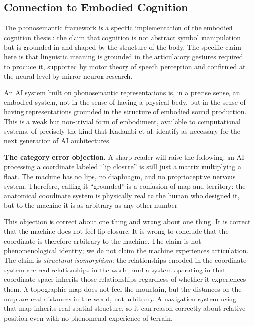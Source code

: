 \documentclass[12pt]{article}
\begin{document}
\subsection{Connection to Embodied Cognition}

The phonosemantic framework is a specific implementation of the embodied cognition thesis \cite{lakoff1999, varela1991}: the claim that cognition is not abstract symbol manipulation but is grounded in and shaped by the structure of the body. The specific claim here is that linguistic meaning is grounded in the articulatory gestures required to produce it, supported by motor theory of speech perception and confirmed at the neural level by mirror neuron research.

An AI system built on phonosemantic representations is, in a precise sense, an embodied system, not in the sense of having a physical body, but in the sense of having representations grounded in the structure of embodied sound production. This is a weak but non-trivial form of embodiment, available to computational systems, of precisely the kind that Kadambi et al. \cite{kadambi2025} identify as necessary for the next generation of AI architectures.

\textbf{The category error objection.} A sharp reader will raise the following: an AI processing a coordinate labeled ``lip closure'' is still just a matrix multiplying a float. The machine has no lips, no diaphragm, and no proprioceptive nervous system. Therefore, calling it ``grounded'' is a confusion of map and territory: the anatomical coordinate system is physically real to the human who designed it, but to the machine it is as arbitrary as any other number.

This objection is correct about one thing and wrong about one thing. It is correct that the machine does not feel lip closure. It is wrong to conclude that the coordinate is therefore arbitrary to the machine. The claim is not phenomenological identity; we do not claim the machine experiences articulation. The claim is \textit{structural isomorphism}: the relationships encoded in the coordinate system are real relationships in the world, and a system operating in that coordinate space inherits those relationships regardless of whether it experiences them. A topographic map does not feel the mountain, but the distances on the map are real distances in the world, not arbitrary. A navigation system using that map inherits real spatial structure, so it can reason correctly about relative position even with no phenomenal experience of terrain.
\end{document}
